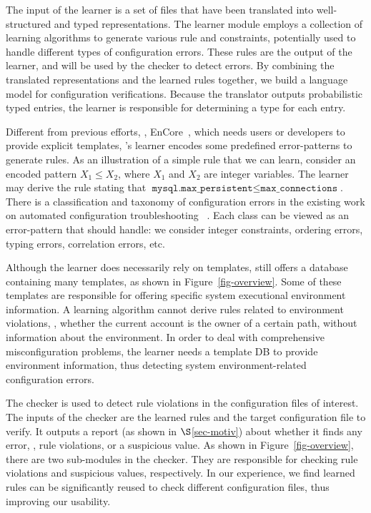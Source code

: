 The input of the learner is a set of files that have been translated
into well-structured and typed representations.
The learner module employs a collection of learning algorithms
to generate various rule and constraints,
potentially used to handle different types of configuration errors.
These rules are the output of the learner, and will be 
used by the checker to detect errors.
By combining the translated representations and the learned
rules together, we build a language model for
configuration verifications.
Because the translator outputs probabilistic typed entries,
the learner is responsible for determining a type for each entry.

Different from previous efforts, \eg, EnCore~\cite{zhang14encore},
which needs users or developers to provide explicit templates,
\app's learner encodes some predefined error-patterns 
to generate rules. 
As an illustration of a simple rule that we can learn,
consider an encoded pattern $X_1 \le X_2$, where $X_1$ and $X_2$ are
integer variables. The learner may derive the rule stating that
$\texttt{mysql.max\_persistent} \le \texttt{max\_connections}$. 
There is a classification and taxonomy of configuration errors in the 
existing work on automated configuration troubleshooting%
~\cite{yin11anempirical, configdataset}. 
Each class can be viewed as an error-pattern 
that \app should handle: we consider integer constraints, 
ordering errors, typing errors, correlation errors, etc.

Although the learner does necessarily rely on templates,
\app still offers a database containing many templates,
as shown in Figure~\ref{fig-overview}.
Some of these templates are responsible for offering
specific system executional environment information.
A learning algorithm cannot derive rules related to environment violations, \eg,
whether the current account is the owner of a certain path, without information 
about the environment. In order to deal with comprehensive misconfiguration problems,
the learner needs a template DB to provide environment information,
thus detecting system environment-related configuration errors.

The checker is used to detect rule violations in the configuration
files of interest. The inputs of the checker are the learned rules 
and the target configuration file to verify.
It outputs a report (as shown in $\S$\ref{sec-motiv}) about 
whether it finds any error, \eg, rule violations, or a suspicious value.
As shown in Figure~\ref{fig-overview},
there are two sub-modules in the checker. They are responsible for
checking rule violations and suspicious values, respectively.
In our experience, we find learned rules can be significantly reused
to check different configuration files, thus improving our usability.  
